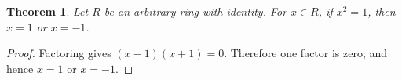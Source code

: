 \documentclass{article}
\newtheorem{theorem}{Theorem}
\begin{document}
\begin{theorem}\label{thm:ring-square-roots-gap}
Let $R$ be an arbitrary ring with identity. For $x\in R$, if $x^2=1$, then $x=1$ or $x=-1$.
\end{theorem}
\begin{proof}
Factoring gives $(x-1)(x+1)=0$. Therefore one factor is zero, and hence $x=1$ or $x=-1$.
\end{proof}
\end{document}
